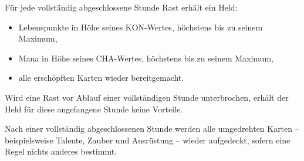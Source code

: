 \begin{kurzregel}[title=Eine Stunde rasten]
Für jede vollständig abgeschlossene Stunde Rast erhält ein Held:

\begin{itemize}
  \item Lebenspunkte in Höhe seines KON-Wertes, höchstens bis zu seinem Maximum,
  \item Mana in Höhe seines CHA-Wertes, höchstens bis zu seinem Maximum,
  \item alle erschöpften Karten wieder bereitgemacht.
\end{itemize}
\end{kurzregel}

Wird eine Rast vor Ablauf einer vollständigen Stunde unterbrochen, erhält der Held für diese angefangene Stunde keine Vorteile.

Nach einer vollständig abgeschlossenen Stunde werden alle umgedrehten Karten -- beispielsweise Talente, Zauber und Ausrüstung -- wieder aufgedeckt, sofern eine Regel nichts anderes bestimmt.
